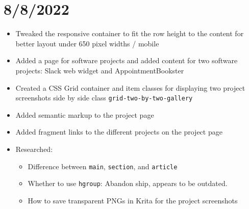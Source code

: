 \documentclass{article}
\begin{document}
\section*{8/8/2022}
\begin{itemize}
	\item Tweaked the responsive container to fit the row height to the content for better layout under 650 pixel widths / mobile
	\item Added a page for software projects and added content for two software projects: Slack web widget and AppointmentBookster
	\item Created a CSS Grid container and item classes for displaying two project screenshots side by side class \texttt{grid-two-by-two-gallery}
	\item Added semantic markup to the project page
	\item Added fragment links to the different projects on the project page
	\item Researched:
		\begin{itemize} 
	 			\item Difference between  \texttt{main},  \texttt{section}, and  \texttt{article}
	 			\item Whether to use \texttt{hgroup}: Abandon ship, appears to be outdated.
				\item How to save transparent PNGs in Krita for the project screenshots
		\end{itemize}
\end{itemize}
\end{document}
